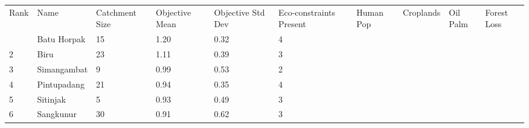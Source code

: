\begin{table}[ht]
\centering
\begingroup\fontsize{8pt}{9pt}\selectfont
\begin{tabular}{C{0.03\textwidth}C{0.12\textwidth}C{0.09\textwidth}C{0.08\textwidth}C{0.08\textwidth}C{0.08\textwidth}C{0.07\textwidth}C{0.07\textwidth}C{0.07\textwidth}C{0.07\textwidth}}
 Rank & Name & Catchment Size & Objective Mean & Objective Std Dev & Eco-constraints  Present & Human Pop & Croplands & Oil Palm & Forest Loss \\ 
  & Batu Horpak &  15 & \textcolor[HTML]{FFFFFF}{1.20} & \textcolor[HTML]{000000}{0.32} & \textcolor[HTML]{FFFFFF}{4} &  &  &  &  \\ 
  {2} & Biru &  23 & \textcolor[HTML]{FFFFFF}{1.11} & \textcolor[HTML]{000000}{0.39} & \textcolor[HTML]{000000}{3} &  &  &  &  \\ 
  {3} & Simangambat &   9 & \textcolor[HTML]{FFFFFF}{0.99} & \textcolor[HTML]{FFFFFF}{0.53} & \textcolor[HTML]{000000}{2} &  &  &  &  \\ 
  {4} & Pintupadang &  21 & \textcolor[HTML]{000000}{0.94} & \textcolor[HTML]{000000}{0.35} & \textcolor[HTML]{FFFFFF}{4} &  &  &  &  \\ 
  {5} & Sitinjak &   5 & \textcolor[HTML]{000000}{0.93} & \textcolor[HTML]{FFFFFF}{0.49} & \textcolor[HTML]{000000}{3} &  &  &  &  \\ 
  {6} & Sangkunur &  30 & \textcolor[HTML]{000000}{0.91} & \textcolor[HTML]{FFFFFF}{0.62} & \textcolor[HTML]{000000}{3} &  &  &  &  \\ 

\end{tabular}
\end{table}
